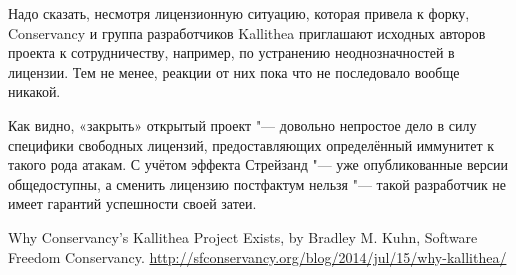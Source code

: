 \documentclass[10pt, a5paper]{article}
\begin{document}
Надо сказать, несмотря лицензионную ситуацию, которая привела к форку, Conservancy и группа разработчиков Kallithea приглашают исходных авторов проекта к сотрудничеству, например, по устранению неоднозначностей в лицензии. Тем не менее, реакции от них пока что не последовало вообще никакой.

Как видно, «закрыть» открытый проект "--- довольно непростое дело в силу специфики свободных лицензий, предоставляющих \linebreak определённый иммунитет к такого рода атакам. С учётом эффекта Стрейзанд "--- уже опубликованные версии общедоступны, а сменить лицензию постфактум нельзя "--- такой разработчик не имеет гарантий успешности своей затеи.

\begin{thebibliography}{9}
 Why Conservancy's Kallithea Project Exists, by Bradley M. Kuhn, Software Freedom Conservancy. \url{http://sfconservancy.org/blog/2014/jul/15/why-kallithea/}
\end{thebibliography}
\end{document}
